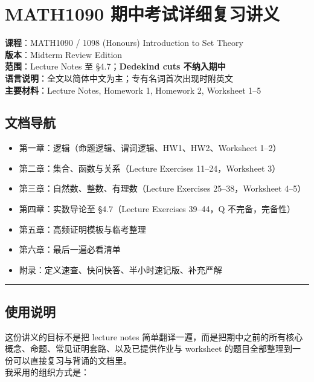 \documentclass[
  11pt,
]{article}
\author{}
\date{}
\providecommand{\tightlist}{%
  \setlength{\itemsep}{0pt}\setlength{\parskip}{0pt}}
\begin{document}
\section{MATH1090
期中考试详细复习讲义}\label{math1090-ux671fux4e2dux8003ux8bd5ux8be6ux7ec6ux590dux4e60ux8bb2ux4e49}

\textbf{课程}：MATH1090 / 1098 (Honours) Introduction to Set Theory\\
\textbf{版本}：Midterm Review Edition\\
\textbf{范围}：Lecture Notes 至 §4.7；\textbf{Dedekind cuts
不纳入期中}\\
\textbf{语言说明}：全文以简体中文为主；专有名词首次出现时附英文\\
\textbf{主要材料}：Lecture Notes, Homework 1, Homework 2, Worksheet 1--5

\subsection{文档导航}\label{ux6587ux6863ux5bfcux822a}

\begin{itemize}
\tightlist
\item
  第一章：逻辑（命题逻辑、谓词逻辑、HW1、HW2、Worksheet 1--2）
\item
  第二章：集合、函数与关系（Lecture Exercises 11--24，Worksheet 3）
\item
  第三章：自然数、整数、有理数（Lecture Exercises 25--38，Worksheet
  4--5）
\item
  第四章：实数导论至 §4.7（Lecture Exercises 39--44，Q 不完备，完备性）
\item
  第五章：高频证明模板与临考整理
\item
  第六章：最后一遍必看清单
\item
  附录：定义速查、快问快答、半小时速记版、补充严解
\end{itemize}

\begin{center}\rule{0.5\linewidth}{0.5pt}\end{center}

\subsection{使用说明}\label{ux4f7fux7528ux8bf4ux660e}

这份讲义的目标不是把 lecture notes
简单翻译一遍，而是把期中之前的所有核心概念、命题、常见证明套路、以及已提供作业与
worksheet 的题目全部整理到一份可以直接复习与背诵的文档里。\\
我采用的组织方式是：
\end{document}
